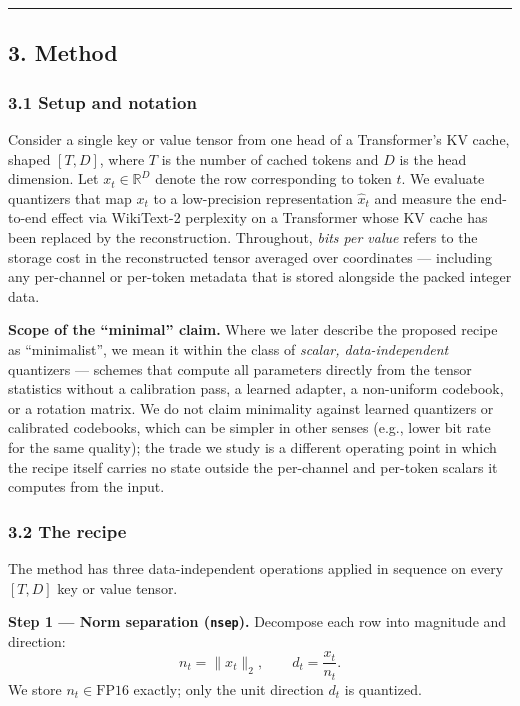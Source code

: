 \documentclass[
]{article}
\begin{document}
\begin{center}\rule{0.5\linewidth}{0.5pt}\end{center}

\subsection{3. Method}\label{method}

\subsubsection{3.1 Setup and notation}\label{setup-and-notation}

Consider a single key or value tensor from one head of a Transformer's
KV cache, shaped \([T, D]\), where \(T\) is the number of cached tokens
and \(D\) is the head dimension. Let \(x_t \in \mathbb{R}^{D}\) denote
the row corresponding to token \(t\). We evaluate quantizers that map
\(x_t\) to a low-precision representation \(\hat{x}_t\) and measure the
end-to-end effect via WikiText-2 perplexity on a Transformer whose KV
cache has been replaced by the reconstruction. Throughout, \emph{bits
per value} refers to the storage cost in the reconstructed tensor
averaged over coordinates --- including any per-channel or per-token
metadata that is stored alongside the packed integer data.

\textbf{Scope of the ``minimal'' claim.} Where we later describe the
proposed recipe as ``minimalist'', we mean it within the class of
\emph{scalar, data-independent} quantizers --- schemes that compute all
parameters directly from the tensor statistics without a calibration
pass, a learned adapter, a non-uniform codebook, or a rotation matrix.
We do not claim minimality against learned quantizers or calibrated
codebooks, which can be simpler in other senses (e.g., lower bit rate
for the same quality); the trade we study is a different operating point
in which the recipe itself carries no state outside the per-channel and
per-token scalars it computes from the input.

\subsubsection{3.2 The recipe}\label{the-recipe}

The method has three data-independent operations applied in sequence on
every \([T, D]\) key or value tensor.

\textbf{Step 1 --- Norm separation (\texttt{nsep}).} Decompose each row
into magnitude and direction: \[
n_t = \|x_t\|_2,\qquad d_t = \frac{x_t}{n_t}.
\] We store \(n_t \in \text{FP16}\) exactly; only the unit direction
\(d_t\) is quantized.
\end{document}

